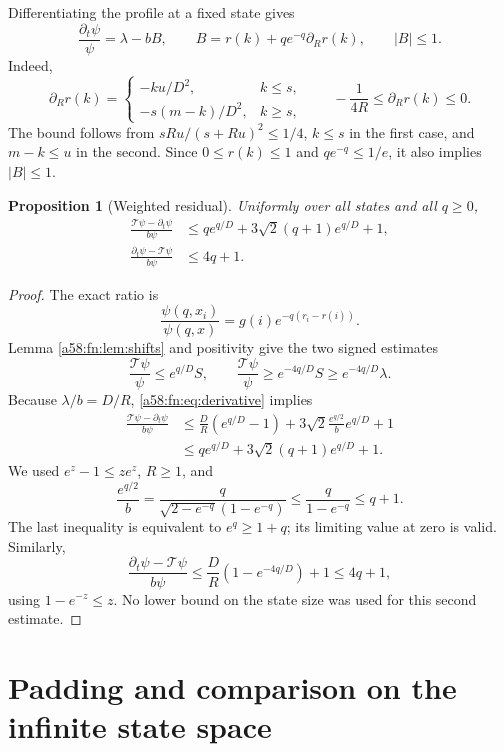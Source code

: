 \documentclass[11pt,letterpaper]{article}
\newtheorem{proposition}[theorem]{Proposition}
\theoremstyle{remark}
\newcommand{\TT}{\mathcal T}
\begin{document}
Differentiating the profile at a fixed state gives
\begin{equation}\label{a58:fn:eq:derivative}
 \frac{\partial_t\psi}{\psi}=\lambda-bB,\qquad
 B=r(k)+qe^{-q}\partial_Rr(k),\qquad |B|\le1.
\end{equation}
Indeed,
\[
 \partial_Rr(k)=\begin{cases}-ku/D^2,&k\le s,\\
 -s(m-k)/D^2,&k\ge s,
 \end{cases}
 \qquad -\frac1{4R}\le\partial_Rr(k)\le0.
\]
The bound follows from $sRu/(s+Ru)^2\le1/4$, $k\le s$ in the first case, and $m-k\le u$ in the second. Since $0\le r(k)\le1$ and $qe^{-q}\le1/e$, it also implies $|B|\le1$.

\begin{proposition}[Weighted residual]\label{a58:fn:prop:residual}
Uniformly over all states and all $q\ge0$,
\begin{align}\label{a58:fn:eq:upperresidual}
 \frac{\TT\psi-\partial_t\psi}{b\psi}
 &\le qe^{q/D}+3\sqrt2(q+1)e^{q/D}+1,\\
 \frac{\partial_t\psi-\TT\psi}{b\psi}
 &\le4q+1.\label{a58:fn:eq:lowerresidual}
\end{align}
\end{proposition}
\begin{proof}
The exact ratio is
\[
 \frac{\psi(q,x_i)}{\psi(q,x)}=g(i)e^{-q(r_i-r(i))}.
\]
Lemma \ref{a58:fn:lem:shifts} and positivity give the two signed estimates
\begin{equation}\label{a58:fn:eq:weightedS}
 \frac{\TT\psi}{\psi}\le e^{q/D}S,\qquad
 \frac{\TT\psi}{\psi}\ge e^{-4q/D}S\ge e^{-4q/D}\lambda.
\end{equation}
Because $\lambda/b=D/R$, \eqref{a58:fn:eq:derivative} implies
\begin{align*}
 \frac{\TT\psi-\partial_t\psi}{b\psi}
 &\le\frac DR(e^{q/D}-1)
       +3\sqrt2\frac{e^{q/2}}b e^{q/D}+1\\
 &\le qe^{q/D}+3\sqrt2(q+1)e^{q/D}+1.
\end{align*}
We used $e^z-1\le ze^z$, $R\ge1$, and
\[
 \frac{e^{q/2}}b
 =\frac q{\sqrt{2-e^{-q}}(1-e^{-q})}
 \le\frac q{1-e^{-q}}\le q+1.
\]
The last inequality is equivalent to $e^q\ge1+q$; its limiting value at zero is valid. Similarly,
\[
 \frac{\partial_t\psi-\TT\psi}{b\psi}
 \le\frac DR(1-e^{-4q/D})+1\le4q+1,
\]
using $1-e^{-z}\le z$. No lower bound on the state size was used for this second estimate.
\end{proof}

\section{Padding and comparison on the infinite state space}\label{a58:fn:sec:comparison}
\end{document}
